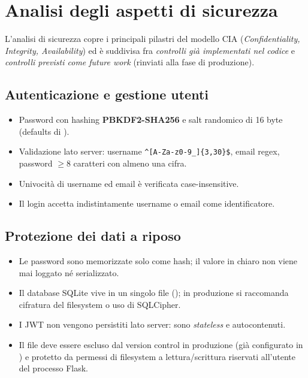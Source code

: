\section{Analisi degli aspetti di sicurezza}\label{sec:sicurezza}

L'analisi di sicurezza copre i principali pilastri del modello CIA
(\emph{Confidentiality, Integrity, Availability}) ed è suddivisa fra
\emph{controlli già implementati nel codice} e \emph{controlli previsti
come future work} (rinviati alla fase di produzione).

\subsection{Autenticazione e gestione utenti}
\begin{itemize}
    \item Password con hashing \textbf{PBKDF2-SHA256} e salt randomico di
    16 byte (defaults di ).
    \item Validazione lato server: username
    \verb|^[A-Za-z0-9_]{3,30}$|, email regex, password $\geq 8$ caratteri
    con almeno una cifra.
    \item Univocità di username ed email è verificata case-insensitive.
    \item Il login accetta indistintamente username o email come
    identificatore.
\end{itemize}

\subsection{Protezione dei dati a riposo}
\begin{itemize}
    \item Le password sono memorizzate solo come hash; il valore in chiaro
    non viene mai loggato né serializzato.
    \item Il database SQLite vive in un singolo file (); in
    produzione si raccomanda cifratura del filesystem o uso di SQLCipher.
    \item I JWT non vengono persistiti lato server: sono \emph{stateless} e
    autocontenuti.
    \item Il file  deve essere escluso dal version control
    in produzione (già configurato in ) e protetto da
    permessi di filesystem a lettura/scrittura riservati all'utente del
    processo Flask.
\end{itemize}

